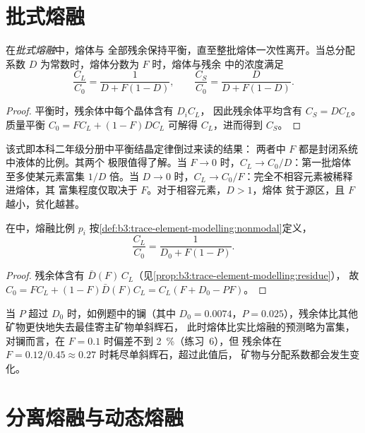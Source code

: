 \section{批式熔融}\label{sec:b3:trace-element-modelling:batch}

\begin{theorem}[批式熔融]\label{thm:b3:trace-element-modelling:batch}
在\emph{批式熔融}中，熔体与
全部残余保持平衡，直至整批熔体一次性离开。当总分配系数
$D$ 为常数时，熔体分数为 $F$ 时，熔体与残余
中的浓度满足
\[
\frac{C_L}{C_0} = \frac{1}{D + F(1 - D)}, \qquad
\frac{C_S}{C_0} = \frac{D}{D + F(1 - D)}.
\]
\end{theorem}

\begin{proof}
平衡时，残余体中每个晶体含有 $D_iC_L$，
因此残余体平均含有 $C_S = DC_L$。质量平衡 $C_0 = FC_L + (1 - F)DC_L$ 可解得
$C_L$，进而得到 $C_S$。
\end{proof}

该式即本科二年级分册中平衡结晶定律倒过来读的结果：
两者中 $F$ 都是封闭系统中液体的比例。其两个
极限值得了解。当 $F \to 0$ 时，$C_L \to C_0/D$：第一批熔体
至多使某元素富集 $1/D$ 倍。当 $D \to 0$ 时，$C_L \to
C_0/F$：完全不相容元素被稀释进熔体，其
富集程度仅取决于 $F$。对于相容元素，$D > 1$，熔体
贫于源区，且 $F$ 越小，贫化越甚。

\begin{proposition}[非实比批式熔融]\label{prop:b3:trace-element-modelling:nonmodal}
在中，熔融比例 $p_i$ 按\cref{def:b3:trace-element-modelling:nonmodal}定义，
\[
\frac{C_L}{C_0} = \frac{1}{D_0 + F(1 - P)}.
\]
\end{proposition}

\begin{proof}
残余体含有 $\bar D(F)\,C_L$（见\cref{prop:b3:trace-element-modelling:residue}），
故 $C_0 = FC_L + (1 - F)\bar D(F)C_L = C_L(F + D_0 - PF)$。
\end{proof}

当 $P$ 超过 $D_0$ 时，如例题中的镧（其中 $D_0 =
0.0074$，$P = 0.025$），残余体比其他矿物更快地失去最佳寄主矿物单斜辉石，
此时熔体比实比熔融的预测略为富集，
对镧而言，在 $F = 0.1$ 时偏差不到 \qty{2}{\percent}（练习~6），但
残余体在 $F = 0.12/0.45 \approx 0.27$ 时耗尽单斜辉石，超过此值后，
矿物与分配系数都会发生变化。

\section{分离熔融与动态熔融}\label{sec:b3:trace-element-modelling:fractional}

